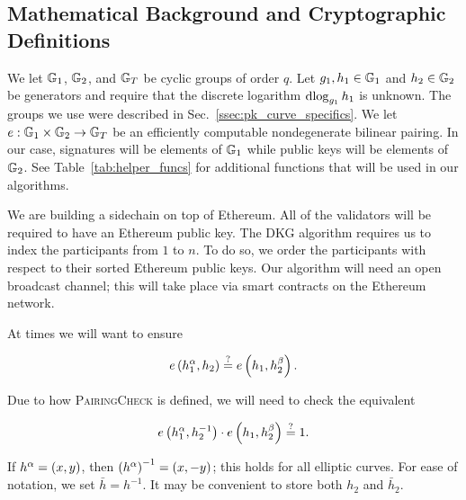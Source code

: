 \subsection{Mathematical Background and Cryptographic Definitions}
\label{ssec:math_def}

We let $\mathbb{G}_{1}$, $\mathbb{G}_{2}$, and $\mathbb{G}_{T}$ be cyclic groups of order $q$.
Let $g_{1}, h_{1}\in\mathbb{G}_{1}$ and $h_{2}\in\mathbb{G}_{2}$ be generators and
require that the discrete logarithm $\operatorname{dlog}_{g_{1}}h_{1}$ is unknown.
The groups we use were described in Sec.~\ref{ssec:pk_curve_specifics}.
We let $e:\mathbb{G}_{1}\times\mathbb{G}_{2}\to\mathbb{G}_{T}$ be an efficiently computable
nondegenerate bilinear pairing.
In our case, signatures will be elements of $\mathbb{G}_{1}$ while
public keys will be elements of $\mathbb{G}_{2}$.
See Table~\ref{tab:helper_funcs} for additional functions
that will be used in our algorithms.



We are building a sidechain on top of Ethereum.
All of the validators will be required to have an Ethereum
public key.
The DKG algorithm requires us to index the participants
from $1$ to $n$.
To do so, we order the participants with respect to their sorted
Ethereum public keys.
Our algorithm will need an open broadcast channel;
this will take place via smart contracts on the Ethereum
network.

At times we will want to ensure

\begin{equation}
    e\left( h_{1}^{\alpha},h_{2} \right) \overset{?}{=}
    e\left( h_{1},h_{2}^{\beta} \right).
\end{equation}

\noindent
Due to how \textsc{PairingCheck} is defined, we
will need to check the equivalent

\begin{equation}
    e\left( h_{1}^{\alpha},h_{2}^{-1} \right)\cdot
        e\left( h_{1},h_{2}^{\beta} \right)
        \overset{?}{=} 1.
\end{equation}

\noindent
If $h^{\alpha} = \left( x,y \right)$, then
$\left( h^{\alpha} \right)^{-1} = \left( x,-y \right)$; this holds for all
elliptic curves.
For ease of notation, we set $\bar{h} = h^{-1}$.
It may be convenient to store both $h_{2}$ and $\bar{h}_{2}$.

